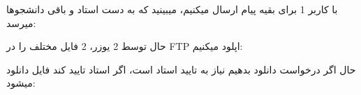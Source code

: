 با کاربر 1 برای بقیه پیام ارسال میکنیم، میبینید که به دست استاد و باقی دانشجوها میرسد:

{
}


{
}

حال توسط 2 یوزر، 2 فایل مختلف را در FTP اپلود میکنیم:

{
}

حال اگر درخواست دانلود بدهیم نیاز به تایید استاد است، اگر استاد تایید کند فایل 
دانلود میشود:

{
}

